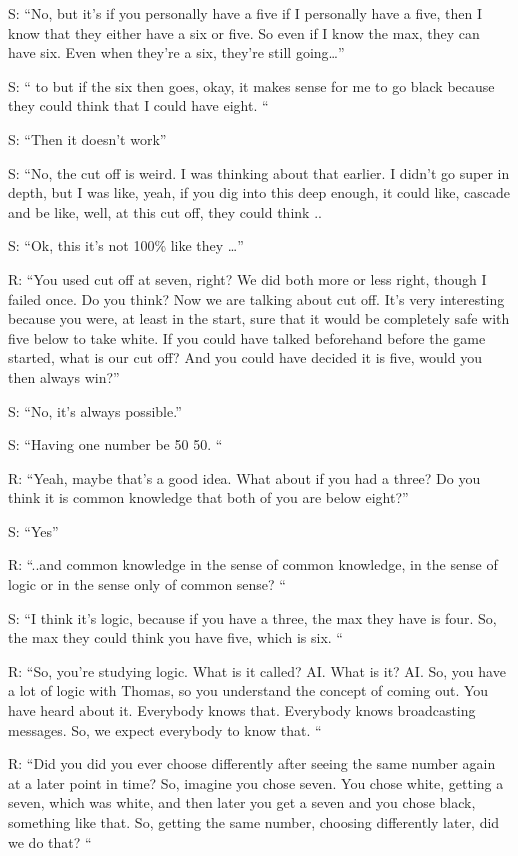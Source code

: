 \documentclass[a4paper,superscriptaddress,nofootinbib]{revtex4}
\begin{document}
S: “No, but it's if you personally have a five if I personally have a five, then I know that they either have a six or five. So even if I know the max, they can have six. Even when they're a six, they're still going…”

S: “ to but if the six then goes, okay, it makes sense for me to go black because they could think that I could have eight. “

S: “Then it doesn't work”

S: “No, the cut off is weird. I was thinking about that earlier. I didn't go super in depth, but I was like, yeah, if you dig into this deep enough, it could like, cascade and be like, well, at this cut off, they could think ..

S: “Ok, this it's not 100\% like they …”

R: “You used cut off at seven, right? We did both more or less right, though I failed once. Do you think? Now we are talking about cut off. It's very interesting because you were, at least in the start, sure that it would be completely safe with five below to take white. If you could have talked beforehand before the game started, what is our cut off? And you could have decided it is five, would you then always win?” 

S: “No, it's always possible.” 

S: “Having one number be 50 50. “

R: “Yeah, maybe that's a good idea. What about if you had a three? Do you think it is common knowledge that both of you are below eight?”

S: “Yes”

R: “..and common knowledge in the sense of common knowledge, in the sense of logic or in the sense only of common sense? “

S: “I think it's logic, because if you have a three, the max they have is four. So, the max they could think you have five, which is six. “

R: “So, you're studying logic. What is it called? AI. What is it? AI. So, you have a lot of logic with Thomas, so you understand the concept of coming out. You have heard about it. Everybody knows that. Everybody knows broadcasting messages. So, we expect everybody to know that. “

R: “Did you did you ever choose differently after seeing the same number again at a later point in time? So, imagine you chose seven. You chose white, getting a seven, which was white, and then later you get a seven and you chose black, something like that. So, getting the same number, choosing differently later, did we do that? “
\end{document}
